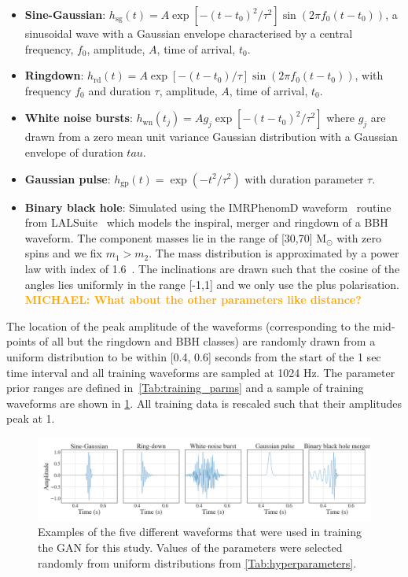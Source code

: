 \documentclass[12pt]{iopart}
\newcommand{\michael}[1]{\textbf{\textcolor{orange}{MICHAEL: #1}}}
\begin{document}
%
\begin{itemize}
%
\item {\bf Sine-Gaussian}: $h_{\text{sg}}(t) = A \exp\left[ - (t-t_{0})^2 /
\tau^2 \right] \sin (2 \pi f_0 (t-t_0))$, a sinusoidal wave with a Gaussian
envelope characterised by a central frequency, $f_0$, amplitude, $A$, time of arrival, $t_{0}$. 
%
\item {\bf Ringdown}: $h_{\text{rd}}(t) = A \exp \left[-{(t-t_0)} / {\tau}
\right] \sin(2 \pi f_0 (t-t_0))$, with frequency $f_0$ and duration $\tau$, amplitude, $A$, time of arrival, $t_{0}$. 
%
\item {\bf White noise bursts}: $h_{\text{wn}}(t_j) = Ag_j\exp\left[ -
(t-t_{0})^2 / \tau^2 \right]$ where $g_j$ are drawn from a zero mean unit
variance Gaussian distribution with a Gaussian envelope of duration $tau$.
%
\item {\bf Gaussian pulse}: $h_{\text{gp}}(t) = \exp(-t^2 / \tau^2)$ with
duration parameter $\tau$.
%
\item {\bf Binary black hole}: Simulated using the IMRPhenomD
waveform~\cite{Khan_2016} routine from LALSuite~\cite{lalsuite} which models
the inspiral, merger and ringdown of a \ac{BBH} waveform. The component masses
lie in the range of [30,70] $\textrm{M}_{\odot}$ with zero spins and we fix
$m_1>m_2$. The mass distribution is approximated by a power law with
index of 1.6~\cite{Abbott_2019}. The inclinations are drawn
such that the cosine of the angles lies uniformly in the range [-1,1] and we only use the plus polarisation. \michael{What about the other parameters like distance?}
%
\end{itemize}
%
The location of the peak amplitude of the waveforms (corresponding to the
mid-points of all but the ringdown and \ac{BBH} classes) are randomly drawn from a uniform distribution to
be within [0.4, 0.6] seconds from the start of the 1 sec time interval and all
training waveforms are sampled at 1024 Hz.  The parameter prior ranges are
defined in~\cref{Tab:training_parms} and a sample of training waveforms are shown in \cref{fig:training_waveforms}. All training data is rescaled such that their amplitudes peak at 1.

\begin{figure}
    \centering
    \includegraphics[width=\textwidth]{figures/training-sample.png}
    \caption{Examples of the five different waveforms that were used in training the \ac{GAN} for this study. Values of the parameters were selected randomly from uniform distributions from \cref{Tab:hyperparameters}.}
    \label{fig:training_waveforms}
\end{figure}
\end{document}
